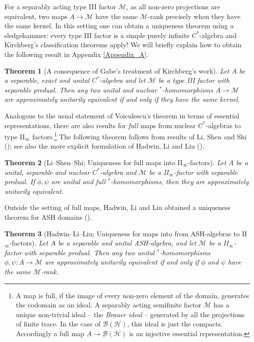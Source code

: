 \documentclass[reqno]{amsart}
\newtheorem*{theorem*}{Theorem}
\theoremstyle{definition}
\theoremstyle{remark}
\numberwithin{equation}{section}
\theoremstyle{definition}
\newcommand{\calM}{\mathcal{M}}
\begin{document}
For a separably acting type III factor $\mathcal M$, as all non-zero projections are equivalent, two maps $A\to\mathcal M$ have the same $\mathcal M$-rank precisely when they have the same kernel.  In this setting one can obtain a uniqueness theorem using a sledgehammer: every type III factor is a simple purely infinite $C^*$-algebra and Kirchberg's classification theorems apply! We will briefly explain how to obtain the following result in Appendix \ref{Appendix_A}.

\begin{theorem*}[A consequence of Gabe's treatment of Kirchberg's work]
Let $A$ be a separable, exact and unital $C^*$-algebra and let $\mathcal M$ be a type III factor with separable predual.  Then any two unital and nuclear $^*$-homomorphisms $A\to\mathcal M$ are approximately unitarily equivalent if and only if they have the same kernel.
\end{theorem*} 

Analogous to the usual statement of Voiculescu's theorem in terms of essential representations, there are also results for \emph{full} maps from nuclear $C^*$-algebras to type II$_\infty$ factors.\footnote{A map is full, if the image of every non-zero element of the domain, generates the codomain as an ideal. A separably acting semifinite factor $\mathcal M$ has a unique non-trivial ideal -- the \emph{Brauer ideal} -- generated by all the projections of finite trace. In the case of $\mathcal B(\mathcal H)$, this ideal is just the compacts. Accordingly a full map $A\to\mathcal B(\mathcal H)$ is an injective essential representation.} The following theorem follows from results of Li, Shen and Shi (\cite[Theorem~5.2.2]{Li_Shen_Shi}); see also the more explicit formulation of Hadwin, Li and Liu (\cite[Theorem~3]{LHL:OM}). 

\begin{theorem*}[Li--Shen--Shi; Uniqueness for full maps into II$_{\infty}$-factors] 
Let $A$ be a unital, separable and nuclear $C^*$-algebra and $\calM$ be a II$_{\infty}$-factor with separable predual. If $\phi, \psi$ are unital and full $^*$-homomorphisms, then they are approximately unitarily equivalent. 
\end{theorem*} 

Outside the setting of full maps, Hadwin, Li and Liu obtained a uniqueness theorem for ASH domains (\cite[Theorem 8]{LHL:OM}).

\begin{theorem*}[Hadwin--Li--Liu; Uniqueness for maps into from ASH-algebras to II$_{\infty}$-factors] 
Let $A$ be a separable and unital ASH-algebra, and let $\calM$ be a II$_{\infty}$-factor with separable predual. Then any two unital $^*$-homomorphisms $\phi, \psi: A\rightarrow \calM$ are approximately unitarily equivalent if and only if $\phi$ and $\psi$ have the same $\mathcal M$-rank.
\end{theorem*}  
\end{document}
